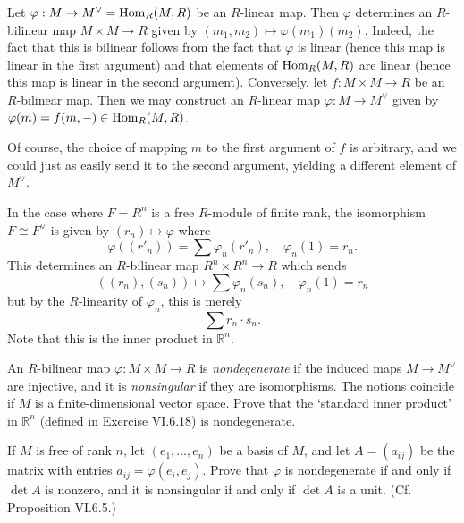 \documentclass[../../master.tex]{subfiles}
\begin{document}
\begin{solution}
    Let $\varphi : M \to M^{\vee} = \operatorname{Hom}_R(M, R)$ be an $R$-linear map.
    Then $\varphi$ determines an $R$-bilinear map $M \times M \to R$ given by $(m_1, m_2) \mapsto \varphi(m_1)(m_2)$.
    Indeed, the fact that this is bilinear follows from the fact that $\varphi$ is linear (hence this map is linear in the first argument) and that elements of $\operatorname{Hom}_R(M, R)$ are linear (hence this map is linear in the second argument).
    Conversely, let $f : M \times M \to R$ be an $R$-bilinear map.
    Then we may construct an $R$-linear map $\varphi : M \to M^{\vee}$ given by $\varphi(m) = f(m, -) \in \operatorname{Hom}_R(M, R)$.

    Of course, the choice of mapping $m$ to the first argument of $f$ is arbitrary, and we could just as easily send it to the second argument, yielding a different element of $M^{\vee}$.

    In the case where $F = R^{n}$ is a free $R$-module of finite rank, the isomorphism $F \cong F^{\vee}$ is given by $(r_n) \mapsto \varphi$ where
    \[
    \varphi((r'_n)) = \sum \varphi_n(r'_n), \quad \varphi_n(1) = r_n.
    \]
    This determines an $R$-bilinear map $R^{n} \times R^{n} \to R$ which sends
    \[
        ((r_n), (s_n)) \mapsto \sum \varphi_n(s_n), \quad \varphi_n(1) = r_n
    \]
    but by the $R$-linearity of $\varphi_n$, this is merely
    \[
    \sum r_n \cdot s_n.
    \]
    Note that this is the inner product in $\mathbb{R}^{n}$.
\end{solution}

\begin{problem}
    An $R$-bilinear map $\varphi : M \times M \to R$ is \textit{nondegenerate} if the induced maps $M \to M^{\vee}$ are injective, and it is \textit{nonsingular} if they are isomorphisms.
    The notions coincide if $M$ is a finite-dimensional vector space.
    Prove that the `standard inner product' in $\mathbb{R}^{n}$ (defined in Exercise VI.6.18) is nondegenerate.

    If $M$ is free of rank $n$, let $(e_1, \ldots, e_n)$ be a basis of $M$, and let $A = (a_{ij})$ be the matrix with entries $a_{ij} = \varphi(e_i, e_j)$.
    Prove that $\varphi$ is nondegenerate if and only if $\det A$ is nonzero, and it is nonsingular if and only if $\det A$ is a unit.
    (Cf. Proposition VI.6.5.)
\end{problem}
\end{document}
